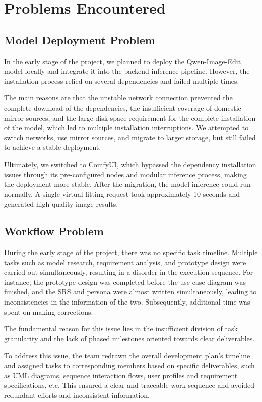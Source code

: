 \chapter{Problems Encountered}
\label{ch:problem}

\section{Model Deployment Problem}
In the early stage of the project, we planned to deploy the Qwen-Image-Edit model locally and integrate it into the backend inference pipeline. However, the installation process relied on several dependencies and failed multiple times. 

The main reasons are that the unstable network connection prevented the complete download of the dependencies, the insufficient coverage of domestic mirror sources, and the large disk space requirement for the complete installation of the model, which led to multiple installation interruptions. We attempted to switch networks, use mirror sources, and migrate to larger storage, but still failed to achieve a stable deployment. 

Ultimately, we switched to ComfyUI, which bypassed the dependency installation issues through its pre-configured nodes and modular inference process, making the deployment more stable. After the migration, the model inference could run normally. A single virtual fitting request took approximately 10 seconds and generated high-quality image results.

\section{Workflow Problem}
During the early stage of the project, there was no specific task timeline. Multiple tasks such as model research, requirement analysis, and prototype design were carried out simultaneously, resulting in a disorder in the execution sequence. For instance, the prototype design was completed before the use case diagram was finished, and the SRS and persona were almost written simultaneously, leading to inconsistencies in the information of the two. Subsequently, additional time was spent on making corrections. 

The fundamental reason for this issue lies in the insufficient division of task granularity and the lack of phased milestones oriented towards clear deliverables. 

To address this issue, the team redrawn the overall development plan's timeline and assigned tasks to corresponding members based on specific deliverables, such as UML diagrams, sequence interaction flows, user profiles and requirement specifications, etc. This ensured a clear and traceable work sequence and avoided redundant efforts and inconsistent information.

